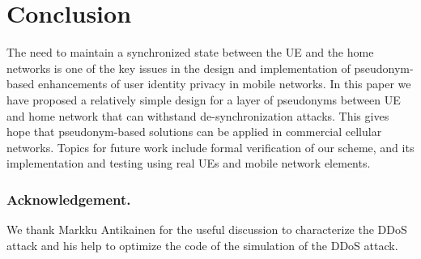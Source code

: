 \documentclass{llncs} %
\begin{document}
\section{Conclusion} \label{sec:conclusion}
The need to maintain a synchronized state between the UE and the home networks is one of the key issues in the design and implementation of pseudonym-based enhancements of user identity privacy in mobile networks. In this paper we have proposed  a relatively simple design for a layer of pseudonyms between UE and home network that can withstand de-synchronization attacks. This gives hope that pseudonym-based solutions can be applied in commercial cellular networks. Topics for future work include formal verification of our scheme, and its implementation and testing using real UEs and mobile network elements.


\subsubsection{Acknowledgement.}
\label{sec:acknowledgement}
We thank Markku Antikainen for the useful discussion to characterize the DDoS attack and his help to optimize the code of the simulation of the DDoS attack.



{}




\end{document}
